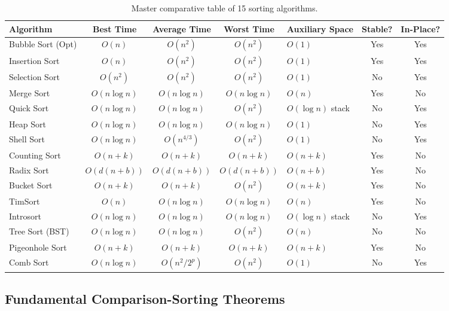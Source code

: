 \begin{table}[htbp]
\centering
\footnotesize
\begin{tabularx}{\textwidth}{l c c c X c c}
\toprule
\textbf{Algorithm} & \textbf{Best Time} & \textbf{Average Time} & \textbf{Worst Time} & \textbf{Auxiliary Space} & \textbf{Stable?} & \textbf{In-Place?} \\
\midrule
Bubble Sort (Opt) & $O(n)$ & $O(n^2)$ & $O(n^2)$ & $O(1)$ & Yes & Yes \\
Insertion Sort    & $O(n)$ & $O(n^2)$ & $O(n^2)$ & $O(1)$ & Yes & Yes \\
Selection Sort    & $O(n^2)$ & $O(n^2)$ & $O(n^2)$ & $O(1)$ & No & Yes \\
Merge Sort        & $O(n \log n)$ & $O(n \log n)$ & $O(n \log n)$ & $O(n)$ & Yes & No \\
Quick Sort        & $O(n \log n)$ & $O(n \log n)$ & $O(n^2)$ & $O(\log n)$ stack & No & Yes \\
Heap Sort         & $O(n \log n)$ & $O(n \log n)$ & $O(n \log n)$ & $O(1)$ & No & Yes \\
Shell Sort        & $O(n \log n)$ & $O(n^{4/3})$ & $O(n^2)$ & $O(1)$ & No & Yes \\
Counting Sort     & $O(n + k)$ & $O(n + k)$ & $O(n + k)$ & $O(n + k)$ & Yes & No \\
Radix Sort        & $O(d(n + b))$ & $O(d(n + b))$ & $O(d(n + b))$ & $O(n + b)$ & Yes & No \\
Bucket Sort       & $O(n + k)$ & $O(n + k)$ & $O(n^2)$ & $O(n + k)$ & Yes & No \\
TimSort           & $O(n)$ & $O(n \log n)$ & $O(n \log n)$ & $O(n)$ & Yes & No \\
Introsort         & $O(n \log n)$ & $O(n \log n)$ & $O(n \log n)$ & $O(\log n)$ stack & No & Yes \\
Tree Sort (BST)   & $O(n \log n)$ & $O(n \log n)$ & $O(n^2)$ & $O(n)$ & No & No \\
Pigeonhole Sort   & $O(n + k)$ & $O(n + k)$ & $O(n + k)$ & $O(n + k)$ & Yes & No \\
Comb Sort         & $O(n \log n)$ & $O(n^2 / 2^p)$ & $O(n^2)$ & $O(1)$ & No & Yes \\
\bottomrule
\end{tabularx}
\caption{Master comparative table of 15 sorting algorithms.}
\end{table}

\subsection{Fundamental Comparison-Sorting Theorems}

